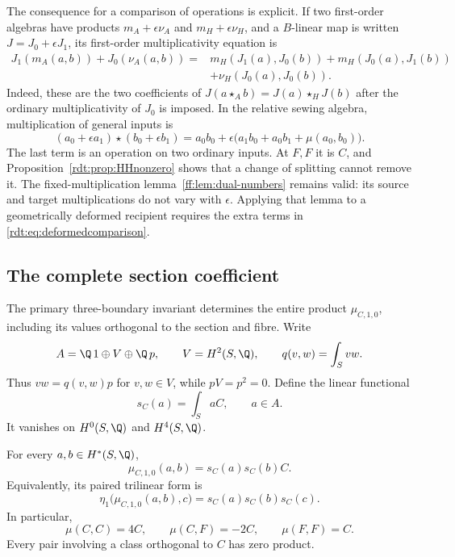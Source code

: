 The consequence for a comparison of operations is explicit.
If two first-order algebras have products
$m_A+\epsilon\nu_A$ and $m_H+\epsilon\nu_H$, and a $B$-linear
map is written $J=J_0+\epsilon J_1$, its first-order
multiplicativity equation is
\begin{equation}\label{rdt:eq:deformedcomparison}
\begin{aligned}
 J_1(m_A(a,b))+J_0(\nu_A(a,b))
  ={}&m_H(J_1(a),J_0(b))+m_H(J_0(a),J_1(b))\\
    &+\nu_H(J_0(a),J_0(b)).
\end{aligned}
\end{equation}
Indeed, these are the two coefficients of
$J(a\star_A b)=J(a)\star_H J(b)$ after the ordinary
multiplicativity of $J_0$ is imposed. In the relative sewing
algebra, multiplication of general inputs is
\begin{equation}\label{rdt:eq:allfirstorderterms}
 (a_0+\epsilon a_1)\star(b_0+\epsilon b_1)
 =a_0b_0+\epsilon\bigl(a_1b_0+a_0b_1+\mu(a_0,b_0)\bigr).
\end{equation}
The last term is an operation on two ordinary inputs. At $F,F$
it is $C$, and Proposition~\ref{rdt:prop:HHnonzero} shows that a
change of splitting cannot remove it. The fixed-multiplication
lemma~\ref{ff:lem:dual-numbers} remains valid: its source and
target multiplications do not vary with $\epsilon$. Applying that
lemma to a geometrically deformed recipient requires the extra
terms in \eqref{rdt:eq:deformedcomparison}.

\subsection{The complete section coefficient}

The primary three-boundary invariant determines the entire product
$\mu_{C,1,0}$, including its values orthogonal to the section and fibre.
Write
\[
 A=\Q\,1\oplus V\oplus\Q\,p,\qquad V=H^2(S,\Q),
 \qquad q(v,w)=\int_Svw.
\]
Thus $vw=q(v,w)p$ for $v,w\in V$, while $pV=p^2=0$.
Define the linear functional
\[
 s_C(a)=\int_SaC,\qquad a\in A.
\]
It vanishes on $H^0(S,\Q)$ and $H^4(S,\Q)$.

\begin{proposition}
\label{rdt:prop:sectioncubic}
For every $a,b\in H^*(S,\Q)$,
\[
 \mu_{C,1,0}(a,b)=s_C(a)s_C(b)C.
\]
Equivalently, its paired trilinear form is
\begin{equation}\label{rdt:eq:sectioncubic}
 \eta_1\bigl(\mu_{C,1,0}(a,b),c\bigr)
       =s_C(a)s_C(b)s_C(c).
\end{equation}
In particular,
\[
 \mu(C,C)=4C,\qquad \mu(C,F)=-2C,\qquad \mu(F,F)=C.
\]
Every pair involving a class orthogonal to $C$ has zero product.
\end{proposition}

